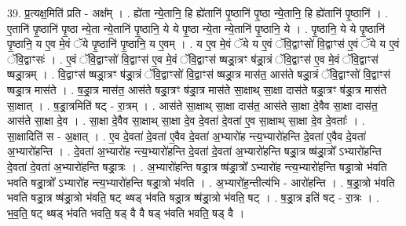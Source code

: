 \documentclass[17pt]{extarticle}
\begin{document}
39. प्र॒त्यक्ष॒मिति॑ प्रति - अक्ष᳚म् । . ह्ये॑ता न्ये॒तानि॒ हि ह्ये॑तानि॑ पृ॒ष्ठानि॑ पृ॒ष्ठा न्ये॒तानि॒ हि ह्ये॑तानि॑ पृ॒ष्ठानि॑ । . ए॒तानि॑ पृ॒ष्ठानि॑ पृ॒ष्ठा न्ये॒ता न्ये॒तानि॑ पृ॒ष्ठानि॒ ये ये पृ॒ष्ठा न्ये॒ता न्ये॒तानि॑ पृ॒ष्ठानि॒ ये । . पृ॒ष्ठानि॒ ये ये पृ॒ष्ठानि॑ पृ॒ष्ठानि॒ य ए॒व मे॒वं ॅये पृ॒ष्ठानि॑ पृ॒ष्ठानि॒ य ए॒वम् । . य ए॒व मे॒वं ॅये य ए॒वं ॅवि॒द्वाꣳसो॑ वि॒द्वाꣳस॑ ए॒वं ॅये य ए॒वं ॅवि॒द्वाꣳसः॑ । . ए॒वं ॅवि॒द्वाꣳसो॑ वि॒द्वाꣳस॑ ए॒व मे॒वं ॅवि॒द्वाꣳस॑ ष्षड्रा॒त्रꣳ ष॑ड्रा॒त्रं ॅवि॒द्वाꣳस॑ ए॒व मे॒वं ॅवि॒द्वाꣳस॑ ष्षड्रा॒त्रम् । . वि॒द्वाꣳस॑ ष्षड्रा॒त्रꣳ ष॑ड्रा॒त्रं ॅवि॒द्वाꣳसो॑ वि॒द्वाꣳस॑ ष्षड्रा॒त्र मास॑त॒ आस॑ते षड्रा॒त्रं ॅवि॒द्वाꣳसो॑ वि॒द्वाꣳस॑ ष्षड्रा॒त्र मास॑ते । . ष॒ड्रा॒त्र मास॑त॒ आस॑ते षड्रा॒त्रꣳ ष॑ड्रा॒त्र मास॑ते सा॒क्षाथ् सा॒क्षा दास॑ते षड्रा॒त्रꣳ ष॑ड्रा॒त्र मास॑ते सा॒क्षात् । . ष॒ड्रा॒त्रमिति॑ षट् - रा॒त्रम् । . आस॑ते सा॒क्षाथ् सा॒क्षा दास॑त॒ आस॑ते सा॒क्षा दे॒वैव सा॒क्षा दास॑त॒ आस॑ते सा॒क्षा दे॒व । . सा॒क्षा दे॒वैव सा॒क्षाथ् सा॒क्षा दे॒व दे॒वता॑ दे॒वता॑ ए॒व सा॒क्षाथ् सा॒क्षा दे॒व दे॒वताः᳚ । . सा॒क्षादिति॑ स - अ॒क्षात् । . ए॒व दे॒वता॑ दे॒वता॑ ए॒वैव दे॒वता॑ अ॒भ्यारो॑ह न्त्य॒भ्यारो॑हन्ति दे॒वता॑ ए॒वैव दे॒वता॑ अ॒भ्यारो॑हन्ति । . दे॒वता॑ अ॒भ्यारो॑ह न्त्य॒भ्यारो॑हन्ति दे॒वता॑ दे॒वता॑ अ॒भ्यारो॑हन्ति षड्रा॒त्र ष्ष॑ड्रा॒त्रो᳚ ऽभ्यारो॑हन्ति दे॒वता॑ दे॒वता॑ अ॒भ्यारो॑हन्ति षड्रा॒त्रः । . अ॒भ्यारो॑हन्ति षड्रा॒त्र ष्ष॑ड्रा॒त्रो᳚ ऽभ्यारो॑ह न्त्य॒भ्यारो॑हन्ति षड्रा॒त्रो भ॑वति भवति षड्रा॒त्रो᳚ ऽभ्यारो॑ह न्त्य॒भ्यारो॑हन्ति षड्रा॒त्रो भ॑वति । . अ॒भ्यारो॑ह॒न्तीत्य॑भि - आरो॑हन्ति । . ष॒ड्रा॒त्रो भ॑वति भवति षड्रा॒त्र ष्ष॑ड्रा॒त्रो भ॑वति॒ षट् थ्षड् भ॑वति षड्रा॒त्र ष्ष॑ड्रा॒त्रो भ॑वति॒ षट् । . ष॒ड्रा॒त्र इति॑ षट् - रा॒त्रः । . भ॒व॒ति॒ षट् थ्षड् भ॑वति भवति॒ षड् वै वै षड् भ॑वति भवति॒ षड् वै । \newline
\end{document}
